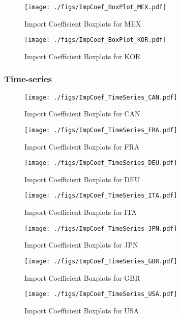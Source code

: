 \documentclass[11pt]{article}
\begin{document}
\begin{figure}[t]
\centering
\texttt{[image: ./figs/ImpCoef\_BoxPlot\_MEX.pdf]}
\caption{Import Coefficient Boxplots for MEX}
\end{figure}

\begin{figure}[t]
\centering
\texttt{[image: ./figs/ImpCoef\_BoxPlot\_KOR.pdf]}
\caption{Import Coefficient Boxplots for KOR}
\end{figure}
\subsubsection{Time-series}
\label{sec:orgd78aafb}


\begin{figure}[t]
\centering
\texttt{[image: ./figs/ImpCoef\_TimeSeries\_CAN.pdf]}
\caption{Import Coefficient Boxplots for CAN}
\end{figure}

\begin{figure}[t]
\centering
\texttt{[image: ./figs/ImpCoef\_TimeSeries\_FRA.pdf]}
\caption{Import Coefficient Boxplots for FRA}
\end{figure}

\begin{figure}[t]
\centering
\texttt{[image: ./figs/ImpCoef\_TimeSeries\_DEU.pdf]}
\caption{Import Coefficient Boxplots for DEU}
\end{figure}

\begin{figure}[t]
\centering
\texttt{[image: ./figs/ImpCoef\_TimeSeries\_ITA.pdf]}
\caption{Import Coefficient Boxplots for ITA}
\end{figure}

\begin{figure}[t]
\centering
\texttt{[image: ./figs/ImpCoef\_TimeSeries\_JPN.pdf]}
\caption{Import Coefficient Boxplots for JPN}
\end{figure}

\begin{figure}[t]
\centering
\texttt{[image: ./figs/ImpCoef\_TimeSeries\_GBR.pdf]}
\caption{Import Coefficient Boxplots for GBR}
\end{figure}

\begin{figure}[t]
\centering
\texttt{[image: ./figs/ImpCoef\_TimeSeries\_USA.pdf]}
\caption{Import Coefficient Boxplots for USA}
\end{figure}
\end{document}
